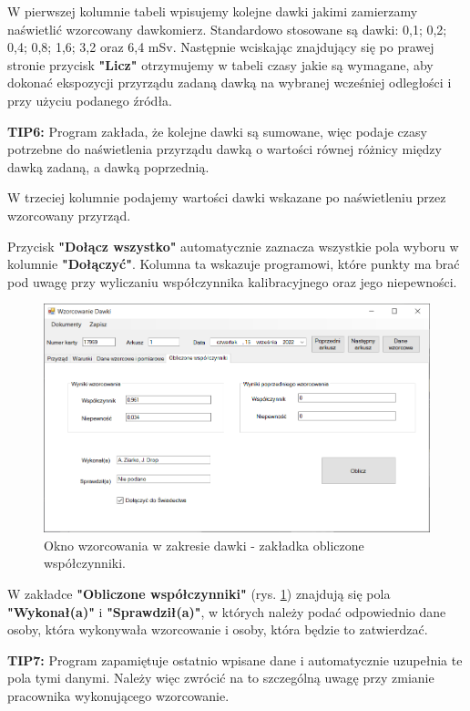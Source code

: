 {W pierwszej kolumnie tabeli wpisujemy kolejne dawki jakimi zamierzamy naświetlić wzorcowany dawkomierz. Standardowo stosowane są dawki: 0,1; 0,2; 0,4; 0,8; 1,6; 3,2 oraz 6,4 mSv. Następnie wciskając znajdujący się po prawej stronie przycisk \textbf{"Licz"} otrzymujemy w tabeli czasy jakie są wymagane, aby dokonać ekspozycji przyrządu zadaną dawką na wybranej wcześniej odległości i przy użyciu podanego źródła.

\textbf{TIP6:} Program zakłada, że kolejne dawki są sumowane, więc podaje czasy potrzebne do naświetlenia przyrządu dawką o wartości równej różnicy między dawką zadaną, a dawką poprzednią.

W trzeciej kolumnie podajemy wartości dawki wskazane po naświetleniu przez wzorcowany przyrząd.

Przycisk \textbf{"Dołącz wszystko"} automatycznie zaznacza wszystkie pola wyboru w kolumnie \textbf{"Dołączyć"}. Kolumna ta wskazuje programowi, które punkty ma brać pod uwagę przy wyliczaniu współczynnika kalibracyjnego oraz jego niepewności.

\begin{figure}[htb]
	\centering
	\includegraphics[width=\columnwidth]{obrazki/Wzorcowanie/dawka/wspolczynniki.png}
	\caption{Okno wzorcowania w zakresie dawki - zakładka obliczone współczynniki.}
	\label{dawkaWspolczynniki}
\end{figure}

W zakładce \textbf{"Obliczone współczynniki"} (rys. \ref{dawkaWspolczynniki}) znajdują się pola \textbf{"Wykonał(a)"} i \textbf{"Sprawdził(a)"}, w których należy podać odpowiednio dane osoby, która wykonywała wzorcowanie i osoby, która będzie to zatwierdzać. 

\textbf{TIP7:} Program zapamiętuje ostatnio wpisane dane i automatycznie uzupełnia te pola tymi danymi. Należy więc zwrócić na to szczególną uwagę przy zmianie pracownika wykonującego wzorcowanie.

}
